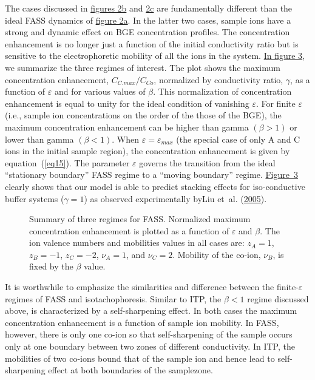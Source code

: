 \documentclass[lineno,authoryear]{FLO_v1}%
\theoremstyle{definition}
\begin{document}
The cases discussed in \hyperref[fig2]{figures 2b} and
\hyperref[fig2]{2c} are fundamentally different than the
ideal FASS dynamics of \hyperref[fig2]{figure 2a}. In the
latter two cases, sample ions have a strong and dynamic
effect on BGE concentration profiles. The concentration
enhancement is no longer just a function of the initial
conductivity ratio but is sensitive to the electrophoretic
mobility of all the ions in the system. \hyperref[fig3]{In
figure 3}, we summarize the three regimes of interest. The
plot shows the maximum concentration enhancement,
$C_{C.max}/C_{Co}$, normalized by conductivity ratio,
$\gamma$, as a function of $\varepsilon$ and for various
values of $\beta$. This normalization of concentration
enhancement is equal to unity for the ideal condition of
vanishing $\varepsilon$. For finite $\varepsilon$ (i.e.,
sample ion concentrations on the order of the those of the
BGE), the maximum concentration enhancement can be higher
than gamma $(\beta
>1)$ or lower than gamma $(\beta<1)$. When
$\varepsilon =\varepsilon_{max}$ (the special case of only
A and C ions in the initial sample region), the
concentration enhancement is given by
equation~(\ref{eq15}). The parameter $\varepsilon$ governs
the transition from the ideal ``stationary boundary'' FASS
regime to a ``moving boundary'' regime.
\hyperref[fig3]{Figure~3} clearly shows that our model is
able to predict stacking effects for iso-conductive buffer
systems ($\gamma=1$) as observed experimentally by\break Liu
et~al. (\hyperlink{bib18}{2005}).

\begin{figure}[]
\caption{Summary of three regimes for FASS. Normalized maximum
concentration enhancement is plotted as a function of
$\varepsilon$ and $\beta$. The ion valence numbers
and mobilities values in all cases are: $z_{A}=1$,
$z_{B}=-1$, $z_{C}=-2$, $\nu_{A}=1$, and
$\nu_{C}=2$. Mobility of the co-ion, $\nu_{B}$, is fixed
by the $\beta$ value.\label{fig3}}
\end{figure}

It is worthwhile to emphasize the similarities and
difference between the finite-$\varepsilon$ regimes of FASS
and isotachophoresis. Similar to ITP, the $\beta< 1$ regime
discussed above, is characterized by a self-sharpening
effect. In both cases the maximum concentration enhancement
is a function of sample ion mobility. In FASS, however,
there is only one co-ion so that self-sharpening of the
sample occurs only at one boundary between two zones of
different conductivity. In ITP, the mobilities of two
co-ions bound that of the sample ion and hence lead to
self-sharpening effect at both boundaries of the sample\break zone.
\end{document}
